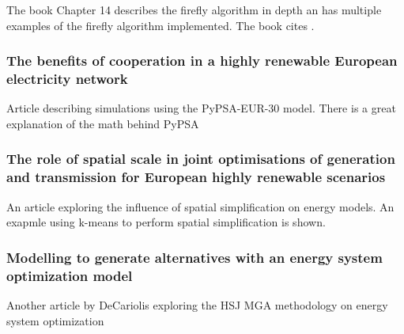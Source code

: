 The book \cite{Bio_computation_book} Chapter 14 describes the firefly algorithm in depth an has multiple examples of the firefly algorithm implemented. The book cites \cite{FireFly_MGA_Article} . 

\subsubsection{The benefits of cooperation in a highly renewable European electricity network \cite{PypsaModel}}
Article describing simulations using the PyPSA-EUR-30 model. There is a great explanation of the math behind PyPSA 

\subsubsection{The role of spatial scale in joint optimisations of generation and transmission for European highly renewable scenarios\cite{spatialInfluence} }
An article exploring the influence of spatial simplification on energy models. An exapmle using k-means to perform spatial simplification is shown.  

\subsubsection{Modelling to generate alternatives with an energy system optimization model \cite{DECAROLIS2016}}
Another article by DeCariolis exploring the HSJ MGA methodology on energy system optimization 